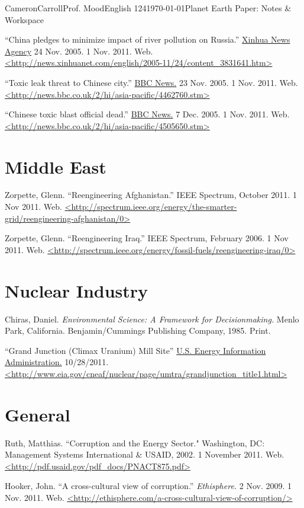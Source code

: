 \documentclass[12pt,letterpaper]{article}
\begin{document}
\begin{mla}{Cameron}{Carroll}{Prof. Mood}{English 124}{\today}{Planet Earth Paper: Notes \& Workspace}
\begin{workscited}
\bibent
``China pledges to minimize impact of river pollution on Russia.'' \underline{Xinhua News Agency} 24 Nov. 2005. 1 Nov. 2011. Web.
\url{<http://news.xinhuanet.com/english/2005-11/24/content_3831641.htm>}

\bibent
``Toxic leak threat to Chinese city.'' \underline{BBC News.} 23 Nov. 2005. 1 Nov. 2011. Web. \url{<http://news.bbc.co.uk/2/hi/asia-pacific/4462760.stm>}

\bibent
``Chinese toxic blast official dead.'' \underline{BBC News.} 7 Dec. 2005. 1 Nov. 2011. Web.
\url{<http://news.bbc.co.uk/2/hi/asia-pacific/4505650.stm>}

\section*{\small{Middle East}}


\bibent
Zorpette, Glenn. ``Reengineering Afghanistan.'' IEEE Spectrum, October 2011. 1 Nov 2011. Web. \url{<http://spectrum.ieee.org/energy/the-smarter-grid/reengineering-afghanistan/0>}

\bibent
Zorpette, Glenn.  ``Reengineering Iraq.'' IEEE Spectrum, February 2006. 1 Nov 2011. Web. \url{<http://spectrum.ieee.org/energy/fossil-fuels/reengineering-iraq/0>}

\section*{\small{Nuclear Industry}}

\bibent
Chiras, Daniel. \emph{Environmental Science: A Framework for Decisionmaking.} Menlo Park, California. Benjamin/Cummings Publishing Company, 1985. Print.

\bibent
``Grand Junction (Climax Uranium) Mill Site'' \underline{U.S. Energy Information Administration.} 10/28/2011. \url{<http://www.eia.gov/cneaf/nuclear/page/umtra/grandjunction_title1.html>}

\section*{\small{General}}

\bibent
Ruth, Matthias. ``Corruption and the Energy Sector." Washington, DC: Management Systems International \& USAID, 2002. 1 November 2011. Web. \url{<http://pdf.usaid.gov/pdf_docs/PNACT875.pdf>}

\bibent
Hooker, John. ``A cross-cultural view of corruption.'' \emph{Ethisphere.} 2 Nov. 2009. 1 Nov. 2011. Web. \url{<http://ethisphere.com/a-cross-cultural-view-of-corruption/>}


\end{workscited}
\end{mla}
\end{document}
